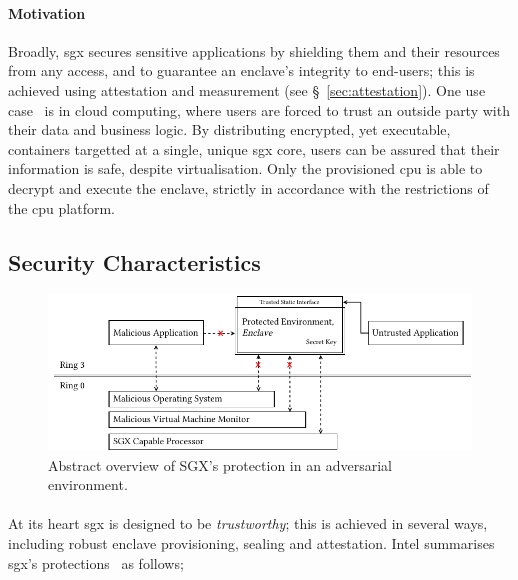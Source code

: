 \paragraph{Motivation} Broadly, \acrshort{sgx} secures sensitive applications by shielding them and their resources from any access, and to guarantee an enclave's integrity to end-users; this is achieved using attestation and measurement (see §~\ref{sec:attestation}). One use case~\cite{10.1145/2834050.2834100, 10.1145/2799647, 10.1145/2810103.2813695} is in cloud computing, where users are forced to trust an outside party with their data and business logic. By distributing encrypted, yet executable, containers targetted at a single, unique \acrshort{sgx} core, users can be assured that their information is safe, despite virtualisation. Only the provisioned \acrshort{cpu} is able to decrypt and execute the enclave, strictly in accordance with the restrictions of the \acrshort{cpu} platform.

\subsection{Security Characteristics}

\begin{figure}[]
    \centering
    \includegraphics[width=0.95\linewidth]{figures/SGX-architecture.pdf}
    \caption{Abstract overview of SGX's protection in an adversarial environment.}
    \label{fig:sgx-basic}
\end{figure}

\paragraph{} At its heart \acrshort{sgx} is designed to be \textit{trustworthy}; this is achieved in several ways, including robust enclave provisioning, sealing and attestation. Intel summarises \acrshort{sgx}'s protections~\cite{10.1145/2487726.2488368,sgx-eval-sdk} as follows;

